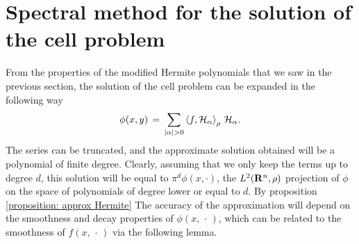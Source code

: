 \section{Spectral method for the solution of the cell problem}
\label{sec:spectral_method_for_the_solution_of_the_cell_problem}

From the properties of the modified Hermite polynomials that we saw in the
previous section, the solution of the cell problem can be expanded in the following way
$$\phi(x,y) \,=\, \sum_{|\alpha|>0} \left \langle f, \hermite H_\alpha \right
\rangle_\rho \, \hermite H_\alpha.$$  
The series can be truncated, and the approximate solution obtained will be a
polynomial of finite degree. Clearly, assuming that we only keep the terms up
to degree $d$, this solution will be equal to $\pi^d \phi (x,\cdot)$, the
$L^2(\mathbf R^n, \rho)$ projection of $\phi$ on the space of polynomials of degree
lower or equal to $d$. By proposition \ref{proposition: approx Hermite} The
accuracy of the approximation will depend on the smoothness and decay
properties of $\phi(x,\,\cdot\,)$, which can be related to the smoothness of
$f(x,\,\cdot\,)$ via the following lemma.

